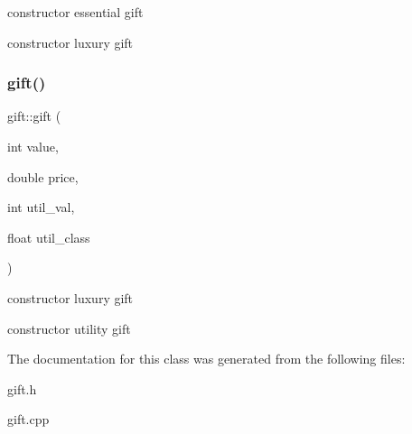 constructor essential gift 

constructor luxury gift \mbox{\label{classgift_ac62aba6ac2db2845c7b60a5496b6de75}} 
\subsubsection{\texorpdfstring{gift()}{gift()}\hspace{0.1cm}{\footnotesize\ttfamily [3/3]}}
{\footnotesize\ttfamily gift\+::gift (\begin{DoxyParamCaption}\item[{int}]{value,  }\item[{double}]{price,  }\item[{int}]{util\+\_\+val,  }\item[{float}]{util\+\_\+class }\end{DoxyParamCaption})}



constructor luxury gift 

constructor utility gift 

The documentation for this class was generated from the following files\+:\begin{DoxyCompactItemize}
\item 
gift.\+h\item 
gift.\+cpp\end{DoxyCompactItemize}
